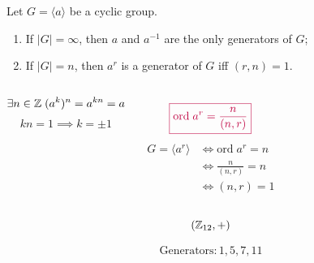 \begin{frame}
  \begin{theorem}
    Let $G = \langle a \rangle$ be a cyclic group.
    \begin{enumerate}[<+->][(1)]
      \setlength{\itemsep}{6pt}
      \item If $|G| = \infty$, then $a$ and $a^{-1}$ are the only generators of $G$;
      \item If $|G| = n$, then $a^{r}$ is a generator of $G$ iff $(r, n) = 1$.
    \end{enumerate}
  \end{theorem}

  \pause
  \begin{columns}
      \begin{center}

        \pause
        \[
          \exists n \in \mathbb{Z}\; (a^{k})^{n} = a^{kn} = a
        \]
        \pause
        \[
          kn = 1 \implies k = \pm 1
        \]
      \end{center}
      \pause
      \[
        \textcolor{purple}{\boxed{\text{ord}\; a^{r} = \frac{n}{(n, r)}}}
      \]
      \pause
      \begin{align*}
        G = \langle a^{r} \rangle &\iff \text{ord}\; a^{r} = n \\
        &\iff \frac{n}{(n, r)} = n \\
        &\iff (n, r) = 1
      \end{align*}
  \end{columns}
\end{frame}

\begin{frame}{}
  \[
    (\mathbb{Z}_{12}, +)
  \]

  \[
    \text{Generators}: 1, 5, 7, 11
  \]
\end{frame}

